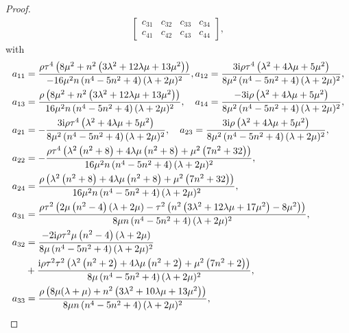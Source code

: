 \documentclass[11pt,reqno,twoside]{amsart}
\theoremstyle{definition}
\theoremstyle{remark}
\numberwithin{equation}{section}
\begin{document}
\begin{proof}
\begin{align}
\begin{bmatrix}
			c_{31} & c_{32} & c_{33}& c_{34}\\
			c_{41} & c_{42} & c_{43}& c_{44}
		\end{bmatrix},
	\end{align}
	with	
	\begin{align}	
		a_{11}&=\frac{\rho   \tau ^4 \left(8 \mu ^2+n^2 \left(3 \lambda ^2+12 \lambda  \mu +13 \mu ^2\right)\right)}{-16 \mu ^2 n \left(n^4-5 n^2+4\right) (\lambda +2 \mu )^2},a_{12}=\frac{3 \mathrm{i} \rho  \tau ^4 \left(\lambda ^2+4 \lambda  \mu +5 \mu ^2\right)}{8 \mu ^2 \left(n^4-5 n^2+4\right) (\lambda +2 \mu )^2},\notag\\
		a_{13}&=\frac{\rho   \left(8 \mu ^2+n^2 \left(3 \lambda ^2+12 \lambda  \mu +13 \mu ^2\right)\right)}{16 \mu ^2 n \left(n^4-5 n^2+4\right) (\lambda +2 \mu )^2},\quad a_{14}=\frac{-3 \mathrm{i} \rho   \left(\lambda ^2+4 \lambda  \mu +5 \mu ^2\right)}{8 \mu ^2 \left(n^4-5 n^2+4\right) (\lambda +2 \mu )^2},\notag\\	
		a_{21}&=-\frac{3 \mathrm{i} \rho   \tau ^4 \left(\lambda ^2+4 \lambda  \mu +5 \mu ^2\right)}{8 \mu ^2 \left(n^4-5 n^2+4\right) (\lambda +2 \mu )^2},\quad a_{23}=\frac{3 \mathrm{i} \rho   \left(\lambda ^2+4 \lambda  \mu +5 \mu ^2\right)}{8 \mu ^2 \left(n^4-5 n^2+4\right) (\lambda +2 \mu )^2},\notag\\
		a_{22}&=-\frac{\rho  \tau ^4 \left(\lambda ^2 \left(n^2+8\right)+4 \lambda  \mu  \left(n^2+8\right)+\mu ^2 \left(7 n^2+32\right)\right)}{16 \mu ^2 n \left(n^4-5 n^2+4\right) (\lambda +2 \mu )^2},\notag\\
		a_{24}&=\frac{\rho   \left(\lambda ^2 \left(n^2+8\right)+4 \lambda  \mu  \left(n^2+8\right)+\mu ^2 \left(7 n^2+32\right)\right)}{16 \mu ^2 n \left(n^4-5 n^2+4\right) (\lambda +2 \mu )^2},\notag\\
		a_{31}&=\frac{\rho   \tau ^2 \left(2 \mu  \left(n^2-4\right) (\lambda +2 \mu )-\tau ^2 \left(n^2 \left(3 \lambda ^2+12 \lambda  \mu +17 \mu ^2\right)-8 \mu ^2\right)\right)}{8 \mu  n \left(n^4-5 n^2+4\right) (\lambda +2 \mu )^2},\notag\\
		a_{32}&=\frac{- 2 \mathrm{i} \rho   \tau ^2\mu  \left(n^2-4\right) (\lambda +2 \mu )}{8 \mu  \left(n^4-5 n^2+4\right) (\lambda +2 \mu )^2}\notag\\
		&+\frac{ \mathrm{i} \rho   \tau ^2\tau ^2 \left(\lambda ^2 \left(n^2+2\right)+4 \lambda  \mu  \left(n^2+2\right)+\mu ^2 \left(7 n^2+2\right)\right)}{8 \mu  \left(n^4-5 n^2+4\right) (\lambda +2 \mu )^2},\notag\\
		a_{33}&=\frac{\rho   \left(8 \mu  (\lambda +\mu )+n^2 \left(3 \lambda ^2+10 \lambda  \mu +13 \mu ^2\right)\right)}{8 \mu  n \left(n^4-5 n^2+4\right) (\lambda +2 \mu )^2},\notag\\

\end{align}
\end{proof}
\end{document}
